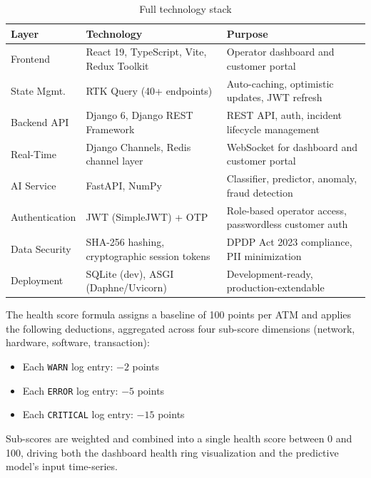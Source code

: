 \documentclass[11pt,a4paper]{article}
\begin{document}
\begin{table}[H]
\centering
\small
\caption{Full technology stack}
\label{tab:stack}
\begin{tabularx}{\linewidth}{@{}llX@{}}
\toprule
\textbf{Layer} & \textbf{Technology} & \textbf{Purpose} \\
\midrule
Frontend        & React 19, TypeScript, Vite, Redux Toolkit & Operator dashboard and customer portal \\
State Mgmt.     & RTK Query (40+ endpoints)                 & Auto-caching, optimistic updates, JWT refresh \\
Backend API     & Django 6, Django REST Framework           & REST API, auth, incident lifecycle management \\
Real-Time       & Django Channels, Redis channel layer      & WebSocket for dashboard and customer portal \\
AI Service      & FastAPI, NumPy                            & Classifier, predictor, anomaly, fraud detection \\
Authentication  & JWT (SimpleJWT) + OTP                     & Role-based operator access, passwordless customer auth \\
Data Security   & SHA-256 hashing, cryptographic session tokens & DPDP Act 2023 compliance, PII minimization \\
Deployment      & SQLite (dev), ASGI (Daphne/Uvicorn)       & Development-ready, production-extendable \\
\bottomrule
\end{tabularx}
\end{table}

The health score formula assigns a baseline of 100 points per ATM and applies the following deductions, aggregated across four sub-score dimensions (network, hardware, software, transaction):

\begin{itemize}
  \item Each \texttt{WARN} log entry: $-2$ points
  \item Each \texttt{ERROR} log entry: $-5$ points
  \item Each \texttt{CRITICAL} log entry: $-15$ points
\end{itemize}

Sub-scores are weighted and combined into a single health score between 0 and 100, driving both the dashboard health ring visualization and the predictive model's input time-series.

\end{document}
